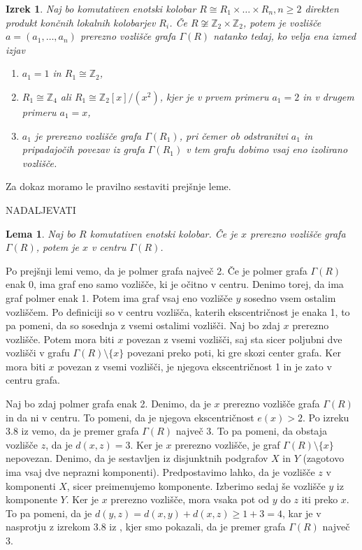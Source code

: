 \documentclass[a4paper, 12pt]{amsart}
\theoremstyle{definition} %
\theoremstyle{plain} %
\newtheorem{lema}[definicija]{Lema}
\newtheorem{izrek}[definicija]{Izrek}
\newcommand{\Z}{\mathbb Z}
\begin{document}
\begin{izrek}
Naj bo komutativen enotski kolobar $R\cong R_1\times \dots \times R_n, n\ge2$ direkten produkt končnih lokalnih kolobarjev $R_i$. Če $R\not\cong \Z_2 \times \Z_2$, potem je vozlišče $a=(a_1,\dots,a_n)$ prerezno vozlišče grafa $\Gamma(R)$ natanko tedaj, ko velja ena izmed  izjav
\begin{enumerate}
\item $a_1=1$ in $R_1 \cong \Z_2$,
\item $R_1\cong \Z_4$ ali $R_1\cong \Z_2[x]/(x^2)$, kjer je v prvem primeru $a_1=2$ in v drugem primeru $a_1 = x$,
\item $a_1$ je prerezno vozlišče grafa $\Gamma(R_1)$, pri čemer ob odstranitvi $a_1$ in pripadajočih povezav iz grafa $\Gamma(R_1)$ v tem grafu dobimo vsaj eno izolirano vozlišče.
\end{enumerate}
\end{izrek}
Za dokaz moramo le pravilno sestaviti prejšnje leme.

\proof

\endproof

NADALJEVATI

\begin{lema}
Naj bo $R$ komutativen enotski kolobar. Če je $x$ prerezno vozlišče grafa $\Gamma(R)$, potem je $x$ v centru $\Gamma(R)$.
\end{lema}

\proof
Po prejšnji lemi vemo, da je polmer grafa največ 2.
Če je polmer grafa $\Gamma(R)$ enak 0, ima graf eno samo vozlišče, ki je očitno v centru. Denimo torej, da ima graf polmer enak 1. Potem ima graf vsaj eno vozlišče $y$ sosedno vsem ostalim vozliščem. Po definiciji so v centru vozlišča, katerih ekscentričnost je enaka 1, to pa pomeni, da so sosednja z vsemi ostalimi vozlišči. Naj bo zdaj $x$ prerezno vozlišče. Potem mora biti $x$ povezan z vsemi vozlišči, saj sta sicer poljubni dve vozlišči v grafu $\Gamma(R)\setminus \{x\}$ povezani preko poti, ki gre skozi center grafa. Ker mora biti $x$ povezan z vsemi vozlišči, je njegova ekscentričnost 1 in je zato v centru grafa.

Naj bo zdaj polmer grafa enak 2. Denimo, da je $x$ prerezno vozlišče grafa $\Gamma(R)$ in da ni v centru. To pomeni, da je njegova ekscentričnost $e(x) > 2$. Po izreku 3.8 iz \cite{diploma} vemo, da je premer grafa $\Gamma(R)$ največ 3. To pa pomeni, da obstaja vozlišče $z$, da je $d(x,z) = 3$. Ker je $x$ prerezno vozlišče, je graf $\Gamma(R) \setminus \{x\}$ nepovezan. Denimo, da je sestavljen iz disjunktnih podgrafov $X$ in $Y$ (zagotovo ima vsaj dve neprazni komponenti). Predpostavimo lahko, da je vozlišče $z$ v komponenti $X$, sicer preimenujemo komponente. Izberimo sedaj še vozlišče $y$ iz komponente $Y$. Ker je $x$ prerezno vozlišče, mora vsaka pot od $y$ do $z$ iti preko $x$. To pa pomeni, da je $d(y,z) = d(x,y) + d(x,z) \ge 1 + 3 = 4$, kar je v nasprotju z izrekom 3.8 iz \cite{diploma}, kjer smo pokazali, da je premer grafa $\Gamma(R)$ največ 3.  
\endproof
\end{document}

